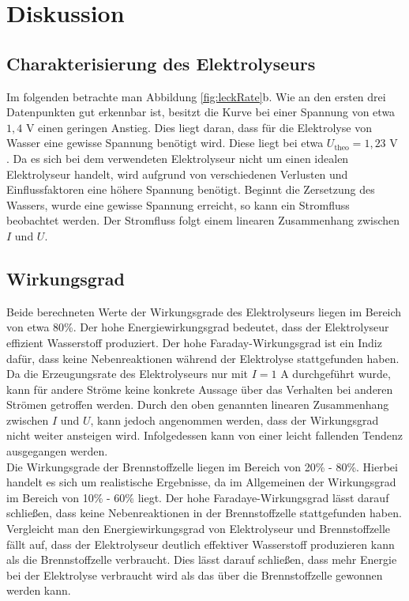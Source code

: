 \documentclass[a4paper,usenatbib]{aspdoc}
\begin{document}
        
        
    \section{Diskussion}\label{sec:discussion}
        \subsection{Charakterisierung des Elektrolyseurs}
            Im folgenden betrachte man Abbildung \ref{fig:leckRate}b. Wie an den ersten drei Datenpunkten gut erkennbar ist, besitzt die Kurve bei einer Spannung von etwa $1,4$ V einen geringen Anstieg. Dies liegt daran, dass für die Elektrolyse von Wasser eine gewisse Spannung benötigt wird. Diese liegt bei etwa $U_{\mathrm{theo}} = 1,23$ V \citep{anleitung}. Da es sich bei dem verwendeten Elektrolyseur nicht um einen idealen Elektrolyseur handelt, wird aufgrund von verschiedenen Verlusten und Einflussfaktoren eine höhere Spannung benötigt. Beginnt die Zersetzung des Wassers, wurde eine gewisse Spannung erreicht, so kann ein Stromfluss beobachtet werden. Der Stromfluss folgt einem linearen Zusammenhang zwischen $I$ und $U$.
        
        
        \subsection{Wirkungsgrad}
            Beide berechneten Werte der Wirkungsgrade des Elektrolyseurs liegen im Bereich von etwa 80\%. Der hohe Energiewirkungsgrad bedeutet, dass der Elektrolyseur effizient Wasserstoff produziert. Der hohe Faraday-Wirkungsgrad ist ein Indiz dafür, dass keine Nebenreaktionen während der Elektrolyse stattgefunden haben. Da die Erzeugungsrate des Elektrolyseurs nur mit $I = 1$ A durchgeführt wurde, kann für andere Ströme keine konkrete Aussage über das Verhalten bei anderen Strömen getroffen werden. Durch den oben genannten linearen Zusammenhang zwischen $I$ und $U$, kann jedoch angenommen werden, dass der Wirkungsgrad nicht weiter ansteigen wird. Infolgedessen kann von einer leicht fallenden Tendenz ausgegangen werden.
            \\
            Die Wirkungsgrade der Brennstoffzelle liegen im Bereich von 20\% - 80\%. Hierbei handelt es sich um realistische Ergebnisse, da im Allgemeinen der Wirkungsgrad im Bereich von 10\% - 60\% liegt. Der hohe Faradaye-Wirkungsgrad lässt darauf schließen, dass keine Nebenreaktionen in der Brennstoffzelle stattgefunden haben.\\
            Vergleicht man den Energiewirkungsgrad von Elektrolyseur und Brennstoffzelle fällt auf, dass der Elektrolyseur deutlich effektiver Wasserstoff produzieren kann als die Brennstoffzelle verbraucht. Dies lässt darauf schließen, dass mehr Energie bei der Elektrolyse verbraucht wird als das über die Brennstoffzelle gewonnen werden kann. 
        
\end{document}
